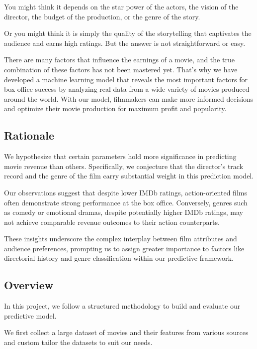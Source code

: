 \documentclass[conference]{IEEEtran}
\begin{document}
        You might think it depends on the star power of the actors, the vision of the director, the budget of the production, or the genre of the story.
        
        Or you might think it is simply the quality of the storytelling that captivates the audience and earns high ratings.
        But the answer is not straightforward or easy.
        
        There are many factors that influence the earnings of a movie, and the true combination of these factors has not been mastered yet.
        That’s why we have developed a machine learning model that reveals the most important factors for box office success by analyzing real data from a wide variety of movies produced around the world.
        With our model, filmmakers can make more informed decisions and optimize their movie production for maximum profit and popularity.

    \subsection{Rationale}
        We hypothesize that certain parameters hold more significance in predicting movie revenue than others. Specifically, we conjecture that the director's track record and the genre of the film carry substantial weight in this prediction model.
        
        Our observations suggest that despite lower IMDb ratings, action-oriented films often demonstrate strong performance at the box office. Conversely, genres such as comedy or emotional dramas, despite potentially higher IMDb ratings, may not achieve comparable revenue outcomes to their action counterparts. 
        
        These insights underscore the complex interplay between film attributes and audience preferences, prompting us to assign greater importance to factors like directorial history and genre classification within our predictive framework.

    \subsection{Overview}
        In this project, we follow a structured methodology to build and evaluate our predictive model.
        
        We first collect a large dataset of movies and their features from various sources and custom tailor the datasets to suit our needs.
        
\end{document}
